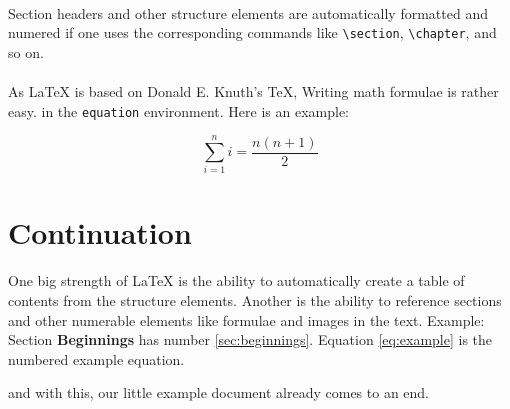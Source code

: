 \documentclass{article}
\begin{document}
\paragraph{} Section headers and other structure elements are automatically formatted and numered
if one uses the corresponding commands like \verb|\section|, \verb|\chapter|, and
so on.


\paragraph{} As {\LaTeX} is based on Donald E. Knuth's {\TeX},
Writing math formulae is rather easy. in the \verb|equation| environment.
Here is an example:


\begin{equation}
\label{eq:example}
\sum_{i=1}^{n}i = \frac{n(n+1)}{2}
\end{equation}

\section{Continuation}

\paragraph{}One big strength of {\LaTeX} is the ability to automatically create a table of contents from the
structure elements. Another is the ability to reference sections and other numerable elements like formulae
and images in the text. Example: Section \textbf{Beginnings} has number \ref{sec:beginnings}.
Equation \ref{eq:example} is the numbered example equation.





and with this, our little example document already comes to an end.
\end{document}
